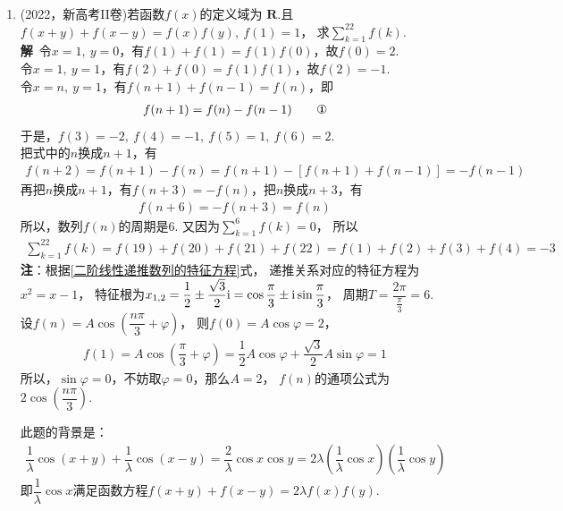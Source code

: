 \begin{enumerate}[label={【\textbf{例\thechapter.\arabic*}】},
 leftmargin=\inteval{\myenumleftmargin}pt,
 itemsep=\inteval{\myenumitempsep}pt,
 itemindent=\inteval{\myenumitemindent}pt]
\item (2022，新高考II卷)若函数$f(x)$的定义域为
$\mathbf{R}$.且$f(x+y)+f(x-y)=f(x)f(y),\ f(1)=1$，
求$\sum\limits_{k=1}^{22}f(k)$.\\
\textbf{解}\ 令$ x=1,\ y=0 $，有$ f(1)+f(1)=f(1)f(0) $，故$ f(0)=2 $. \\
令$ x=1,\ y=1 $，有$ f(2)+f(0)=f(1)f(1) $，故$ f(2)=-1 $. \\
令$ x=n,\ y=1 $，有$ f(n+1)+f(n-1)=f(n) $，即
\begin{gather}
    f(n+1)=f(n)-f(n-1) \tag*{\ding{172}}
\end{gather}
于是，$ f(3)=-2,\ f(4)=-1,\ f(5)=1,\ f(6)=2 $. \\
把式中的$ n $换成$ n+1 $，有
\begin{gather*}
    f(n+2)=f(n+1)-f(n)=f(n+1)-[f(n+1)+f(n-1)]=-f(n-1)
\end{gather*}
再把$ n $换成$ n+1 $，有$ f(n+3)=-f(n) $，把$ n $换成$ n+3 $，有
\begin{gather*}
    f(n+6)=-f(n+3)=f(n)
\end{gather*}
所以，数列$ f(n) $的周期是6. 又因为$ \sum\limits_{k=1}^{6}f(k)=0 $，
所以
\begin{gather*}
    \sum\limits_{k=1}^{22}f(k)=f(19)+f(20)+f(21)+f(22)=
    f(1)+f(2)+f(3)+f(4)=-3
\end{gather*}
\textbf{注}：根据\eqref{二阶线性递推数列的特征方程}式，
递推关系对应的特征方程为$ x^2=x-1 $，
特征根为$ x_{1,2}=\dfrac{1}{2}\pm \dfrac{\sqrt{3}}{2}\mathrm{i}=
\cos\dfrac{\pi}{3}\pm \mathrm{i}\sin\dfrac{\pi}{3} $，
周期$ T=\dfrac{2\pi}{\frac{\pi}{3}}=6 $. 
设$ f(n)=A\cos\left(\dfrac{n\pi}{3}+\varphi\right) $，
则$ f(0)=A\cos\varphi=2 $，
\begin{gather*}
    f(1)=A\cos\left(\dfrac{\pi}{3}+\varphi\right)=
    \dfrac{1}{2}A\cos\varphi+\dfrac{\sqrt{3}}{2}A\sin\varphi=1
\end{gather*}
所以，$ \sin\varphi=0 $，不妨取$ \varphi=0 $，那么$ A=2 $，
$ f(n) $的通项公式为$ 2\cos\left(\dfrac{n\pi}{3}\right) $. 

此题的背景是：
\begin{gather*}
    \dfrac{1}{\lambda}\cos(x+y)+\dfrac{1}{\lambda}\cos(x-y)=
    \dfrac{2}{\lambda}\cos x\cos y=
    2\lambda\left(\dfrac{1}{\lambda}\cos x\right)
    \left(\dfrac{1}{\lambda}\cos y\right)
\end{gather*}
即$ \dfrac{1}{\lambda}\cos x $满足函数方程$ f(x+y)+f(x-y)=2\lambda f(x)f(y) $. 


\end{enumerate}
